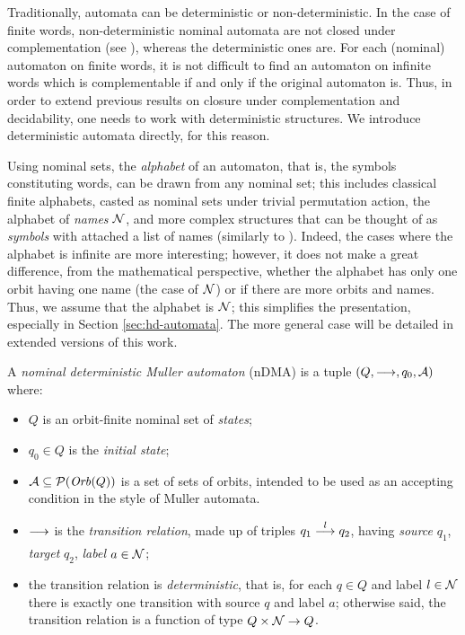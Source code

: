 
Traditionally, automata can be deterministic or non-deterministic. In the case of finite words, non-deterministic nominal automata are not closed under complementation (see \cite{TODO}), whereas the deterministic ones are. For each (nominal) automaton on finite words, it is not difficult to find an automaton on infinite words which is complementable if and only if the original automaton is. Thus, in order to extend previous results on closure under complementation and decidability, one needs to work with deterministic structures. We introduce deterministic automata directly, for this reason. 

\begin{remark} Using nominal sets, the \emph{alphabet} of an automaton, that is, the symbols constituting words, can be drawn from any nominal set; this includes classical finite alphabets, casted as nominal sets under trivial permutation action, the alphabet of \emph{names} $\mathcal{N}$, and more complex structures that can be thought of as \emph{symbols} with attached a list of names (similarly to \cite{MikBartekLICS}). Indeed, the cases where the alphabet is infinite are more interesting; however, it does not make a great difference, from the mathematical perspective, whether the alphabet has only one orbit having one name (the case of $\mathcal{N}$) or if there are more orbits and names. Thus, we assume that the alphabet is $\mathcal{N}$; this simplifies the presentation, especially in Section \ref{sec:hd-automata}. The more general case will be detailed in extended versions of this work.
\end{remark}


\begin{definition}\label{def:ndma}
 A \emph{nominal deterministic Muller automaton} (nDMA) is a tuple $(Q,\overset{}{\longrightarrow},q_0,\mathcal{A})$ where:
 
  \begin{itemize}
  \item $Q$ is an orbit-finite nominal set of \emph{states};
  
  \item $q_0 \in Q$ is the \emph{initial state};
  
  \item $\mathcal{A} \subseteq \mathcal{P}(\mathit{Orb}(Q))$ is a set of sets of orbits, intended to be used as an accepting condition in the style of Muller automata.
  
  \item $\overset{}{\underset{}{\longrightarrow}}$ is the \emph{transition relation}, made up of triples $q_1 \overset{l}{\longrightarrow} q_2$, having \emph{source} $q_1$, \emph{target} $q_2$, \emph{label} $a \in \mathcal{N}$;
  
  \item the transition relation is \emph{deterministic}, that is, for each $q \in Q$ and label $l \in \mathcal{N}$ there is exactly one transition with source $q$ and label $a$; otherwise said, the transition relation is a function of type $Q \times \mathcal{N} \to Q$.
 \end{itemize}
\end{definition}

